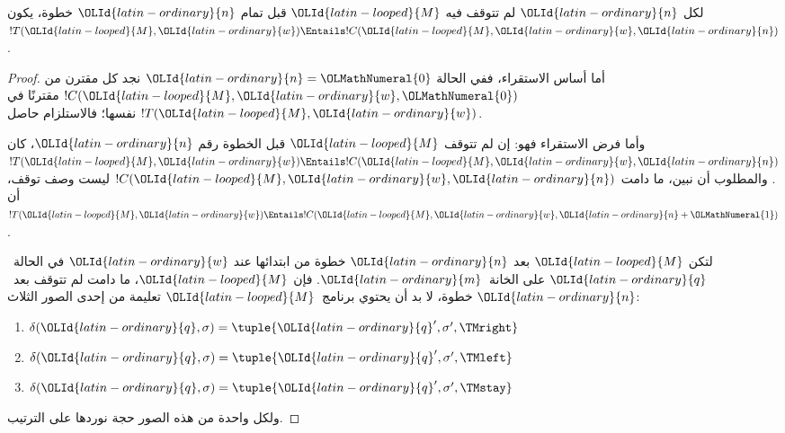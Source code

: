 \documentclass[../../../include/open-logic-section]{subfiles}
\begin{document}
\begin{lem}
لكل $\OLId{latin-ordinary}{n}$ لم تتوقف فيه $\OLId{latin-looped}{M}$ قبل تمام $\OLId{latin-ordinary}{n}$ خطوة، يكون
$!T(\OLId{latin-looped}{M},\OLId{latin-ordinary}{w})\Entails !C(\OLId{latin-looped}{M},\OLId{latin-ordinary}{w},\OLId{latin-ordinary}{n})$.
\end{lem}

\begin{proof}
أما أساس الاستقراء، ففي الحالة $\OLId{latin-ordinary}{n}=\OLMathNumeral{0}$ نجد كل مقترن من
$!C(\OLId{latin-looped}{M},\OLId{latin-ordinary}{w},\OLMathNumeral{0})$ مقترنًا في $!T(\OLId{latin-looped}{M},\OLId{latin-ordinary}{w})$ نفسها؛ فالاستلزام حاصل.

وأما فرض الاستقراء فهو: إن لم تتوقف $\OLId{latin-looped}{M}$ قبل الخطوة رقم $\OLId{latin-ordinary}{n}$،
كان $!T(\OLId{latin-looped}{M},\OLId{latin-ordinary}{w})\Entails !C(\OLId{latin-looped}{M},\OLId{latin-ordinary}{w},\OLId{latin-ordinary}{n})$. والمطلوب أن نبين، ما دامت
$!C(\OLId{latin-looped}{M},\OLId{latin-ordinary}{w},\OLId{latin-ordinary}{n})$ ليست وصف توقف، أن $!T(\OLId{latin-looped}{M},\OLId{latin-ordinary}{w})\Entails !C(\OLId{latin-looped}{M},\OLId{latin-ordinary}{w},\OLId{latin-ordinary}{n}+\OLMathNumeral{1})$.

لتكن $\OLId{latin-looped}{M}$ بعد $\OLId{latin-ordinary}{n}$ خطوة من ابتدائها عند $\OLId{latin-ordinary}{w}$ في الحالة~$\OLId{latin-ordinary}{q}$
على الخانة~$\OLId{latin-ordinary}{m}$. فإن $\OLId{latin-looped}{M}$، ما دامت لم تتوقف بعد~$\OLId{latin-ordinary}{n}$ خطوة،
لا بد أن يحتوي برنامج~$\OLId{latin-looped}{M}$ تعليمة من إحدى الصور الثلاث:

\begin{enumerate}
\item {} $\delta(\OLId{latin-ordinary}{q}, \sigma) = \tuple{\OLId{latin-ordinary}{q}', \sigma', \TMright}$

\item {} $\delta(\OLId{latin-ordinary}{q}, \sigma) = \tuple{\OLId{latin-ordinary}{q}', \sigma', \TMleft}$

\item {} $\delta(\OLId{latin-ordinary}{q}, \sigma) = \tuple{\OLId{latin-ordinary}{q}', \sigma', \TMstay}$
\end{enumerate}

ولكل واحدة من هذه الصور حجة نوردها على الترتيب.


\end{proof}
\end{document}
